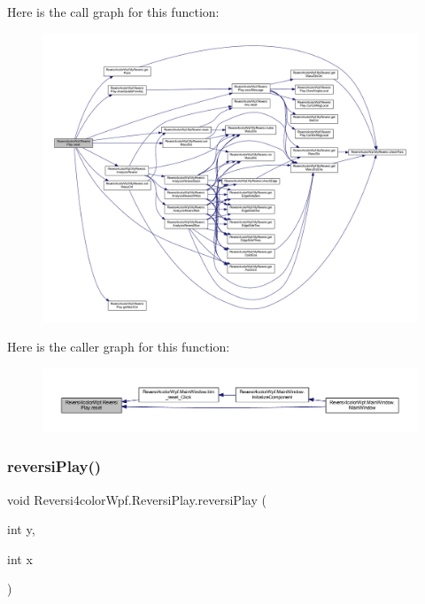 Here is the call graph for this function\+:
\nopagebreak
\begin{figure}[H]
\begin{center}
\leavevmode
\includegraphics[width=350pt]{class_reversi4color_wpf_1_1_reversi_play_a37fb774e5829a4dd99d9af0ca020f912_cgraph}
\end{center}
\end{figure}
Here is the caller graph for this function\+:
\nopagebreak
\begin{figure}[H]
\begin{center}
\leavevmode
\includegraphics[width=350pt]{class_reversi4color_wpf_1_1_reversi_play_a37fb774e5829a4dd99d9af0ca020f912_icgraph}
\end{center}
\end{figure}
\mbox{\label{class_reversi4color_wpf_1_1_reversi_play_a71d9150ecdddaf5e6446430bf8658180}} 
\subsubsection{\texorpdfstring{reversi\+Play()}{reversiPlay()}}
{\footnotesize\ttfamily void Reversi4color\+Wpf.\+Reversi\+Play.\+reversi\+Play (\begin{DoxyParamCaption}\item[{int}]{y,  }\item[{int}]{x }\end{DoxyParamCaption})}



